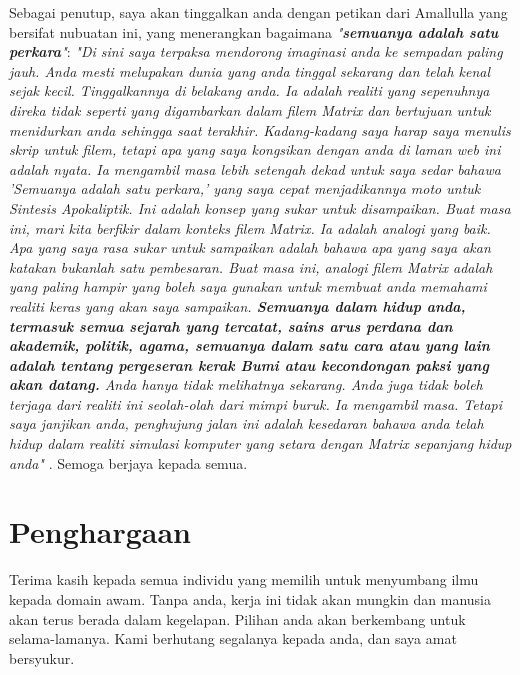\documentclass[10pt,twocolumn,letterpaper]{article}
\begin{document}
Sebagai penutup, saya akan tinggalkan anda dengan petikan dari Amallulla yang bersifat nubuatan ini, yang menerangkan bagaimana \textit{"\textbf{semuanya adalah satu perkara}"}: \textit{"Di sini saya terpaksa mendorong imaginasi anda ke sempadan paling jauh. Anda mesti melupakan dunia yang anda tinggal sekarang dan telah kenal sejak kecil. Tinggalkannya di belakang anda. Ia adalah realiti yang sepenuhnya direka tidak seperti yang digambarkan dalam filem Matrix dan bertujuan untuk menidurkan anda sehingga saat terakhir. Kadang-kadang saya harap saya menulis skrip untuk filem, tetapi apa yang saya kongsikan dengan anda di laman web ini adalah nyata. Ia mengambil masa lebih setengah dekad untuk saya sedar bahawa 'Semuanya adalah satu perkara,' yang saya cepat menjadikannya moto untuk Sintesis Apokaliptik. Ini adalah konsep yang sukar untuk disampaikan. Buat masa ini, mari kita berfikir dalam konteks filem Matrix. Ia adalah analogi yang baik. Apa yang saya rasa sukar untuk sampaikan adalah bahawa apa yang saya akan katakan bukanlah satu pembesaran. Buat masa ini, analogi filem Matrix adalah yang paling hampir yang boleh saya gunakan untuk membuat anda memahami realiti keras yang akan saya sampaikan. \textbf{Semuanya dalam hidup anda, termasuk semua sejarah yang tercatat, sains arus perdana dan akademik, politik, agama, semuanya dalam satu cara atau yang lain adalah tentang pergeseran kerak Bumi atau kecondongan paksi yang akan datang.} Anda hanya tidak melihatnya sekarang. Anda juga tidak boleh terjaga dari realiti ini seolah-olah dari mimpi buruk. Ia mengambil masa. Tetapi saya janjikan anda, penghujung jalan ini adalah kesedaran bahawa anda telah hidup dalam realiti simulasi komputer yang setara dengan Matrix sepanjang hidup anda"} \cite{33,34}.
Semoga berjaya kepada semua.

\section{Penghargaan}

Terima kasih kepada semua individu yang memilih untuk menyumbang ilmu kepada domain awam. Tanpa anda, kerja ini tidak akan mungkin dan manusia akan terus berada dalam kegelapan. Pilihan anda akan berkembang untuk selama-lamanya. Kami berhutang segalanya kepada anda, dan saya amat bersyukur.
\clearpage
\twocolumn

{\small
\renewcommand{\refname}{Rujukan}


}
\end{document}
